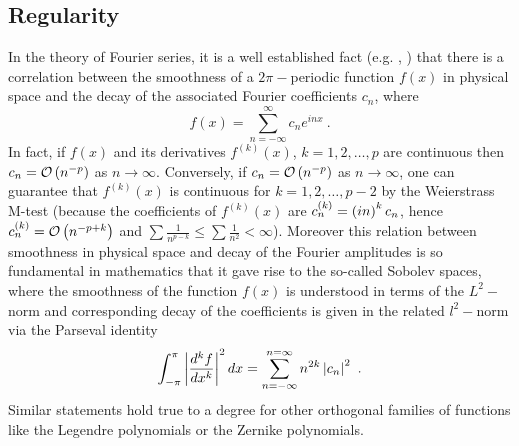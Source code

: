 \documentclass[preprint,12pt]{elsarticle}
\begin{document}
\subsection{Regularity}
In the theory of Fourier series, it is a well established fact (e.g. \cite[example 2.4.9]{classic}, \cite[ch. 6]{modern}) that there is a correlation between the smoothness of a $2\pi-$periodic function $f(x)$ in physical space and the decay of the associated Fourier coefficients $c_{n}$, where
\begin{equation}
  f(x) = \sum_{n=-\infty}^{\infty} c_{n} e^{inx}\ .
\end{equation}
In fact, if $f(x)$ and its derivatives $f^{(k)}(x)$, $k=1,2,\dots,p$ are continuous then $c_{n} = \mathcal{O}\left( n^{-p} \right)$ as $n\to\infty$. Conversely, if $c_{n} = \mathcal{O}\left( n^{-p} \right)$ as $n\to\infty$, one can guarantee that $f^{(k)}(x)$ is continuous for $k=1,2,\dots,p-2$ by the Weierstrass M-test (because the coefficients of $f^{(k)}(x)$ are $c_{n}^{(k)} = \left( in \right)^{k} c_{n}$, hence $c_{n}^{(k)} = \mathcal{O}\left( n^{-p+k} \right)$ and $\sum \frac{1}{n^{p-k}} \le \sum \frac{1}{n^{2}} < \infty$). Moreover this relation between smoothness in physical space and decay of the Fourier amplitudes is so fundamental in mathematics that it gave rise to the so-called Sobolev spaces, where the smoothness of the function $f(x)$ is understood in terms of the $L^{2}-$norm and corresponding decay of the coefficients is given in the related $l^{2}-$norm via the Parseval identity
\begin{equation}
  \int_{-\pi}^{\pi} \left|\frac{d^{k}f}{dx^{k}}\right|^{2} dx = \sum_{n=-\infty}^{n=\infty} n^{2k} \left|c_{n}\right|^{2} \ .
\end{equation}
Similar statements hold true to a degree for other orthogonal families of functions like the Legendre polynomials or the Zernike polynomials.

\end{document}
